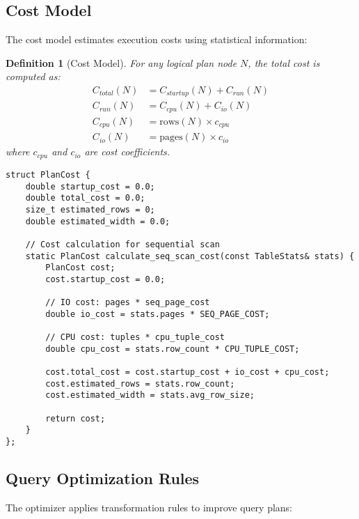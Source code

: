 \documentclass[12pt,a4paper]{article}
\newtheorem{definition}{Definition}[section]
\begin{document}
    \subsection{Cost Model}

    The cost model estimates execution costs using statistical information:

    \begin{definition}[Cost Model]
        For any logical plan node $N$, the total cost is computed as:
        \begin{align}
            C_{total}(N) &= C_{startup}(N) + C_{run}(N) \\
            C_{run}(N) &= C_{cpu}(N) + C_{io}(N) \\
            C_{cpu}(N) &= \text{rows}(N) \times c_{cpu} \\
            C_{io}(N) &= \text{pages}(N) \times c_{io}
        \end{align}
        where $c_{cpu}$ and $c_{io}$ are cost coefficients.
    \end{definition}

    \begin{lstlisting}[style=cpp, caption=Cost Calculation Implementation]
struct PlanCost {
    double startup_cost = 0.0;
    double total_cost = 0.0;
    size_t estimated_rows = 0;
    double estimated_width = 0.0;

    // Cost calculation for sequential scan
    static PlanCost calculate_seq_scan_cost(const TableStats& stats) {
        PlanCost cost;
        cost.startup_cost = 0.0;

        // IO cost: pages * seq_page_cost
        double io_cost = stats.pages * SEQ_PAGE_COST;

        // CPU cost: tuples * cpu_tuple_cost
        double cpu_cost = stats.row_count * CPU_TUPLE_COST;

        cost.total_cost = cost.startup_cost + io_cost + cpu_cost;
        cost.estimated_rows = stats.row_count;
        cost.estimated_width = stats.avg_row_size;

        return cost;
    }
};
    \end{lstlisting}

    \subsection{Query Optimization Rules}

    The optimizer applies transformation rules to improve query plans:
\end{document}
